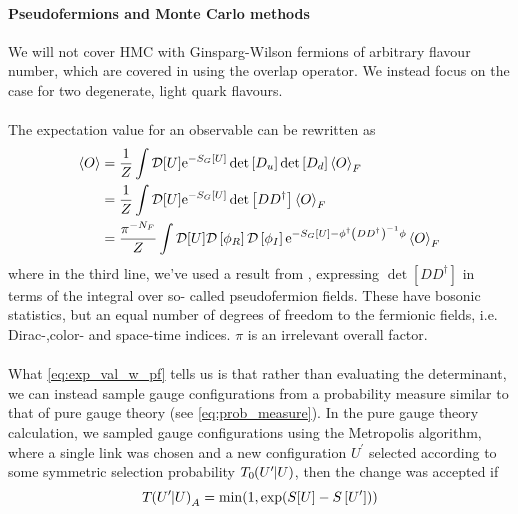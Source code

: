 \documentclass[a4paper,10pt]{book}
\begin{document}
\paragraph{Pseudofermions and Monte Carlo methods}
We will not cover HMC with Ginsparg-Wilson fermions of arbitrary flavour number, which are covered in \cite{DeGrand:2006ws} using the overlap operator. We instead focus on the case for two degenerate, light quark flavours.\\\\ The expectation value for an observable can be rewritten as
\begin{equation}\label{eq:exp_val_w_pf}
\begin{aligned} 
\braket{O}&=\frac{1}{Z} \int \mathcal{D}[U] \mathrm{e}^{-S_{G}[U]} \operatorname{det}\left[D_{u}\right] \operatorname{det}\left[D_{d}\right] \braket{O}_{F}\\&=\frac{1}{Z} \int \mathcal{D}[U] \mathrm{e}^{-S_{G}[U]} \operatorname{det}\left[DD^\dagger\right]\braket{O}_{F}\\&=\frac{\pi^{-N_F}}{Z} \int \mathcal{D}[U]\mathcal{D}\left[\phi_{R}\right] \mathcal{D}\left[\phi_{I}\right] \mathrm{e}^{-S_{G}[U]-\phi^{\dagger}\left(D D^{\dagger}\right)^{-1} \phi}  \braket{O}_{F}
\end{aligned}
\end{equation}
where in the third line, we've used a result from \cite{WeingartenD.H1981MCif}, expressing $\operatorname{det}\left[DD^\dagger\right]$ in terms of the integral over so- called pseudofermion fields. These have bosonic statistics, but an equal number of degrees of freedom to the fermionic fields, i.e. Dirac-,color- and space-time indices. $\pi$ is an irrelevant overall factor.\\\\What \eqref{eq:exp_val_w_pf} tells us is that rather than evaluating the determinant, we can instead sample gauge configurations from a probability measure similar to that of pure gauge theory (see \eqref{eq:prob_measure}). In the pure gauge theory calculation, we sampled gauge configurations using the Metropolis algorithm, where a single link was chosen and a new configuration $U^\prime$ selected according to some symmetric selection probability $T_0\mkern-4mu\left(U^{\prime}\mkern-6mu \mid\mkern-5mu U\right)$, then the change was accepted if
\begin{equation}
T\mkern-4mu\left(U^{\prime}\mkern-6mu \mid\mkern-5mu U\right)_A = \min (1, \exp (S[U]-S\left[U^{\prime}\right]))
\end{equation}
\end{document}
